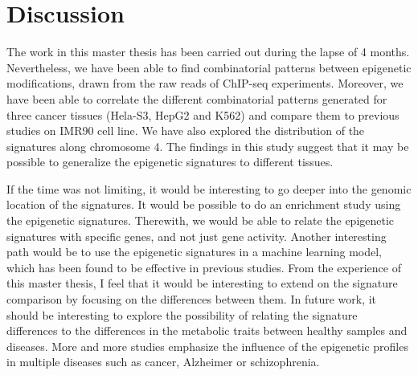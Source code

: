 
\chapter{Discussion}\label{Discussion} %

The work in this master thesis has been carried out during the lapse of 4 months. Nevertheless, we have been able to find combinatorial patterns between epigenetic modifications, drawn from the raw reads of ChIP-seq experiments. Moreover, we have been able to correlate the different combinatorial patterns generated for three cancer tissues (Hela-S3, HepG2 and K562) and compare them to previous studies on IMR90 cell line. We have also explored the distribution of the signatures along chromosome 4. The findings in this study suggest that it may be possible to generalize the epigenetic signatures to different tissues.

\medskip

If the time was not limiting, it would be interesting to go deeper into the genomic location of the signatures. It would be possible to do an enrichment study using the epigenetic signatures. Therewith, we would be able to relate the epigenetic signatures with specific genes, and not just gene activity. Another interesting path would be to use the epigenetic signatures in a machine learning model, which has been found to be effective in previous studies. From the experience of this master thesis, I feel that it would be interesting to extend on the signature comparison by focusing on the differences between them. In future work, it should be interesting to explore the possibility of relating the signature differences to the differences in the metabolic traits between healthy samples and diseases. More and more studies emphasize the influence of the epigenetic profiles in multiple diseases such as cancer, Alzheimer or schizophrenia.
